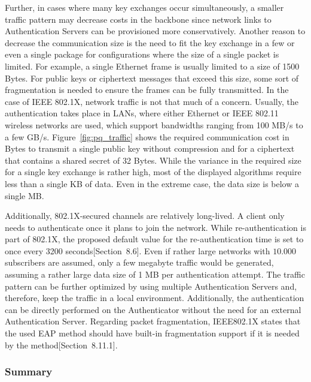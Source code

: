 Further, in cases where many key exchanges occur simultaneously, a smaller traffic pattern may decrease costs in the backbone since network links to Authentication Servers can be provisioned more conservatively. Another reason to decrease the communication size is the need to fit the key exchange in a few or even a single package for configurations where the size of a single packet is limited. For example, a single Ethernet frame is usually limited to a size of 1500 Bytes. For public keys or ciphertext messages that exceed this size, some sort of fragmentation is needed to ensure the frames can be fully transmitted. In the case of IEEE 802.1X, network traffic is not that much of a concern. Usually, the authentication takes place in \acp{LAN}, where either Ethernet or IEEE 802.11 wireless networks are used, which support bandwidths ranging from 100 MB/s to a few GB/s. Figure~\ref{fig:pq_traffic} shows the required communication cost in Bytes to transmit a single public key without compression and for a ciphertext that contains a shared secret of 32 Bytes. While the variance in the required size for a single key exchange is rather high, most of the displayed algorithms require less than a single KB of data. Even in the extreme case, the data size is below a single MB.

Additionally, 802.1X-secured channels are relatively long-lived. A client only needs to authenticate once it plans to join the network. While re-authentication is part of 802.1X, the proposed default value for the re-authentication time is set to once every 3200 seconds[Section~8.6]\cite{IEEE8021X}. Even if rather large networks with \(10.000\) subscribers are assumed, only a few megabyte traffic would be generated, assuming a rather large data size of 1 MB per authentication attempt. The traffic pattern can be further optimized by using multiple Authentication Servers and, therefore, keep the traffic in a local environment. Additionally, the authentication can be directly performed on the Authenticator without the need for an external Authentication Server. Regarding packet fragmentation, IEEE802.1X states that the used \ac{EAP} method should have built-in fragmentation support if it is needed by the method[Section~8.11.1]\cite{IEEE8021X}.

\subsubsection{Summary}

